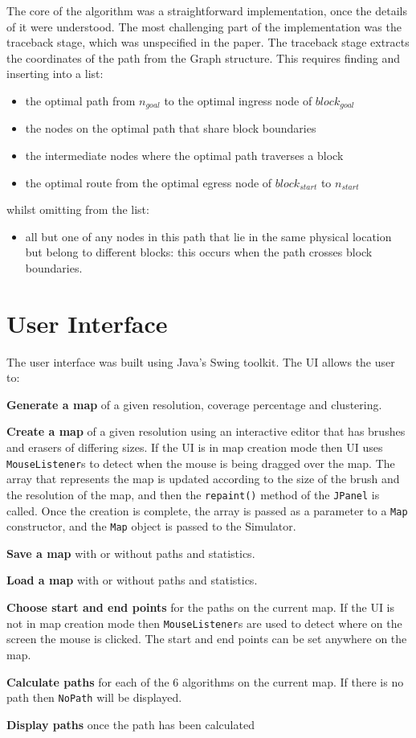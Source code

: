 \documentclass[12pt,twoside,notitlepage]{report}
\begin{document}
\noindent
The core of the algorithm was a straightforward implementation, once the details of it were understood. The most challenging part of the implementation was the traceback stage, which was unspecified in the paper. The traceback stage extracts the coordinates of the path from the Graph structure. This requires finding and inserting into a list:
\begin{itemize}
\item the optimal path from $n_{goal}$ to the optimal ingress node of $block_{goal}$
\item the nodes on the optimal path that share block boundaries
\item the intermediate nodes where the optimal path traverses a block
\item the optimal route from the optimal egress node of $block_{start}$ to $n_{start}$
\end{itemize}
\noindent
whilst omitting from the list:
\begin{itemize}
\item all but one of any nodes in this path that lie in the same physical location but belong to different blocks: this occurs when the path crosses block boundaries.
\end{itemize}
 
\section{User Interface}

The user interface was built using Java's Swing toolkit. The UI allows the user to:
\begin{description}
\item{\bf Generate a map} of a given resolution, coverage percentage and clustering.
\item{\bf Create a map} of a given resolution using an interactive editor that has brushes and erasers of differing sizes. If the UI is in map creation mode then UI uses {\tt MouseListener}s to detect when the mouse is being dragged over the map. The array that represents the map is updated according to the size of the brush and the resolution of the map, and then the {\tt repaint()} method of the {\tt JPanel} is called. Once the creation is complete, the array is passed as a parameter to a {\tt Map} constructor, and the {\tt Map} object is passed to the Simulator.
\item{\bf Save a map} with or without paths and statistics.
\item{\bf Load a map} with or without paths and statistics.
\item{\bf Choose start and end points} for the paths on the current map. If the UI is not in map creation mode then {\tt MouseListener}s are used to detect where on the screen the mouse is clicked. The start and end points can be set anywhere on the map.
\item{\bf Calculate paths} for each of the 6 algorithms on the current map. If there is no path then {\tt NoPath} will be displayed.
\item{\bf Display paths} once the path has been calculated
\end{description}
\end{document}
